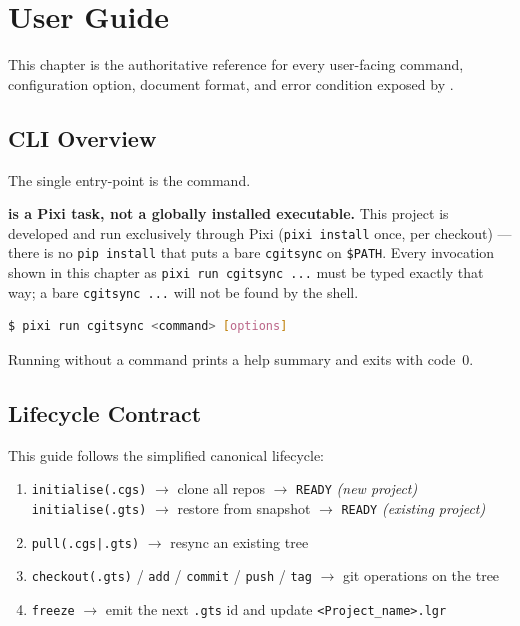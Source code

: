\chapter{User Guide}
\label{chap:user-guide}

This chapter is the authoritative reference for every user-facing command,
configuration option, document format, and error condition exposed by
\cgspkg{}.

\section{CLI Overview}

The single entry-point is the \cgscli{} command.

\textbf{\cgscli{} is a Pixi task, not a globally installed executable.}
This project is developed and run exclusively through Pixi (\texttt{pixi
install} once, per checkout) --- there is no \texttt{pip install} that puts
a bare \texttt{cgitsync} on \texttt{\$PATH}. Every invocation shown in this
chapter as \texttt{pixi run cgitsync ...} must be typed exactly that way;
a bare \texttt{cgitsync ...} will not be found by the shell.

\begin{lstlisting}[language=bash]
$ pixi run cgitsync <command> [options]
\end{lstlisting}

Running \cgscli{} without a command prints a help summary and exits with
code~0.

\section{Lifecycle Contract}

This guide follows the simplified canonical lifecycle:

\begin{enumerate}
  \item \texttt{initialise(.cgs)} $\rightarrow$ clone all repos $\rightarrow$
        \texttt{READY}  \textit{(new project)}\\
        \texttt{initialise(.gts)} $\rightarrow$ restore from snapshot $\rightarrow$
        \texttt{READY}  \textit{(existing project)}
  \item \texttt{pull(.cgs|.gts)} $\rightarrow$ resync an existing tree
  \item \texttt{checkout(.gts)} / \texttt{add} / \texttt{commit} / \texttt{push} / \texttt{tag}
        $\rightarrow$ git operations on the tree
  \item \texttt{freeze} $\rightarrow$ emit the next \texttt{.gts} id and update \texttt{<Project\_name>.lgr}
\end{enumerate}

